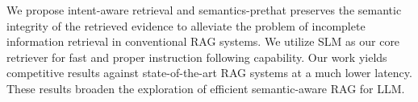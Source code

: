 We propose intent-aware retrieval and semantics-prethat preserves the semantic integrity of the retrieved evidence to alleviate the problem of incomplete information retrieval in conventional RAG systems.
We utilize SLM as our core retriever for fast and proper instruction following capability.
Our work yields competitive results against state-of-the-art RAG systems at a much lower latency.
These results broaden the exploration of efficient semantic-aware RAG for LLM.

